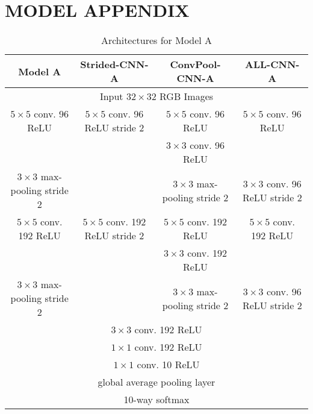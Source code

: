 \appendix
\section{MODEL APPENDIX}
\begin{table*}
  \centering
  \begin{tabular}{|c|c|c|c|}
    \hline
    Model A & Strided-CNN-A & ConvPool-CNN-A & ALL-CNN-A \\
    \hline
    \multicolumn{4}{|c|}{Input $32\times32$ RGB Images} \\
    \hline
    $5\times5$ conv. 96 ReLU & $5\times5$ conv. 96 ReLU stride 2 &  $5\times5$ conv. 96 ReLU & $5\times5$ conv. 96 ReLU \\
    & & $3\times3$ conv. 96 ReLU & \\
    \hline
    $3\times3$ max-pooling stride 2 & & $3\times3$ max-pooling stride 2& $3\times3$ conv. 96 ReLU stride 2 \\
    \hline
    $5\times5$ conv. 192 ReLU & $5\times5$ conv. 192 ReLU stride 2 &  $5\times5$ conv. 192 ReLU & $5\times5$ conv. 192 ReLU \\
    & & $3\times3$ conv. 192 ReLU & \\
    \hline
    $3\times3$ max-pooling stride 2 & & $3\times3$ max-pooling stride 2& $3\times3$ conv. 96 ReLU stride 2 \\
    \hline
    \multicolumn{4}{|c|}{$3\times3$ conv. 192 ReLU} \\
    \hline
    \multicolumn{4}{|c|}{$1\times1$ conv. 192 ReLU} \\
    \hline
    \multicolumn{4}{|c|}{$1\times1$ conv. 10 ReLU} \\
    \hline
    \multicolumn{4}{|c|}{global average pooling layer} \\
    \hline
    \multicolumn{4}{|c|}{10-way softmax} \\
    \hline
  \end{tabular}
  \caption{Architectures for Model A}
  \label{tab:modelA}
\end{table*}

